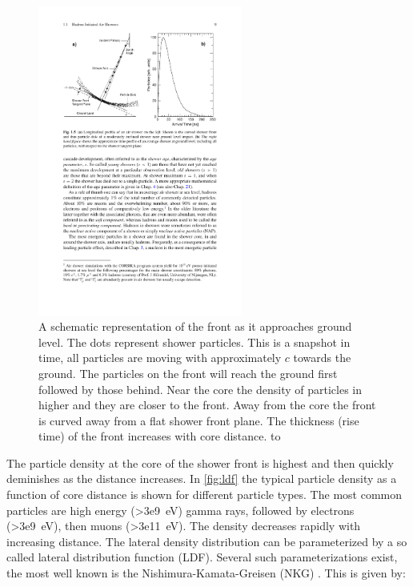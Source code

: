 \begin{figure}
    \centering
    \includegraphics[width=0.6\textwidth]
                    {plots/cosmic-rays/schematic_front}
    \caption{A schematic representation of the front as it approaches ground level. The dots represent shower particles. This is a snapshot in time, all particles are moving with approximately $c$ towards the ground. The particles on the front will reach the ground first followed by those behind. Near the core the density of particles in higher and they are closer to the front. Away from the core the front is curved away from a flat shower front plane. The thickness (rise time) of the front increases with core distance. \cite{grieder2010eas} to \cite{heck2013corsika}}
    \label{fig:schematic_front}
\end{figure}

The particle density at the core of the shower front is highest and then quickly deminishes as the distance increases. In \cref{fig:ldf} the typical particle density as a function of core distance is shown for different particle types. The most common particles are high energy (\SI{>3e9}{\eV}) gamma rays, followed by electrons (\SI{>3e9}{\eV}), then muons (\SI{>3e11}{\eV}). The density decreases rapidly with increasing distance. The lateral density distribution can be parameterized by a so called lateral distribution function (LDF). Several such parameterizations exist, the most well known is the Nishimura-Kamata-Greisen (NKG) \cite{apel2006nkg}. This is given by:

